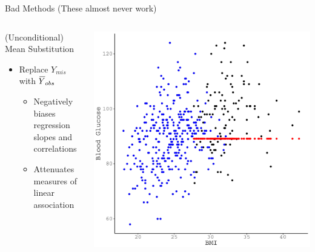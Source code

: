 \documentclass{beamer}\usepackage[]{graphicx}\usepackage[]{color}
\makeatletter
\def\maxwidth{ %
  \ifdim\Gin@nat@width>\linewidth
    \linewidth
  \else
    \Gin@nat@width
  \fi
}
\newenvironment{knitrout}{}{} %
\newcommand*\bigbar[1]{%
  \hbox{%
    \vbox{%
      \hrule height 0.65pt %
      \kern0.35ex%
      \hbox{%
        \kern-0.1em%
        \ensuremath{#1}%
      }%
    }%
  }%
}
\makeatother
\begin{document}

\begin{frame}{Bad Methods (These almost never work)}
  
  \begin{columns}
    \begin{column}{0.5\textwidth}
      
      (Unconditional) Mean Substitution
      \begin{itemize}
      \item Replace $Y_{mis}$ with $\bigbar{Y}_{obs}$
        \begin{itemize}
        \item Negatively biases regression slopes and correlations
        \item Attenuates measures of linear association
        \end{itemize}
      \end{itemize}
      
    \end{column}
    \begin{column}{0.5\textwidth}
      
\begin{knitrout}\footnotesize
{}\color{fgcolor}

{\centering \includegraphics[width=\maxwidth]{figure/unnamed-chunk-19-1} 

}



\end{knitrout}

\end{column}
\end{columns}

\end{frame}
\end{document}

